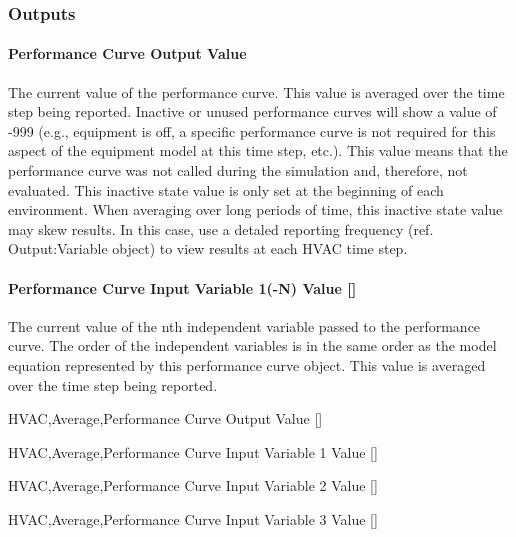 \subsubsection{Outputs}\label{outputs-021}

\paragraph{Performance Curve Output Value}\label{performance-curve-output-value}

The current value of the performance curve. This value is averaged over the time step being reported. Inactive or unused performance curves will show a value of -999 (e.g., equipment is off, a specific performance curve is not required for this aspect of the equipment model at this time step, etc.). This value means that the performance curve was not called during the simulation and, therefore, not evaluated. This inactive state value is only set at the beginning of each environment. When averaging over long periods of time, this inactive state value may skew results. In this case, use a detaled reporting frequency (ref. Output:Variable object) to view results at each HVAC time step.

\paragraph{Performance Curve Input Variable 1(-N) Value {[]}}\label{performance-curve-input-variable-1-n-value}

The current value of the nth independent variable passed to the performance curve. The order of the independent variables is in the same order as the model equation represented by this performance curve object. This value is averaged over the time step being reported.

HVAC,Average,Performance Curve Output Value {[]}

HVAC,Average,Performance Curve Input Variable 1 Value {[]}

HVAC,Average,Performance Curve Input Variable 2 Value {[]}

HVAC,Average,Performance Curve Input Variable 3 Value {[]}
